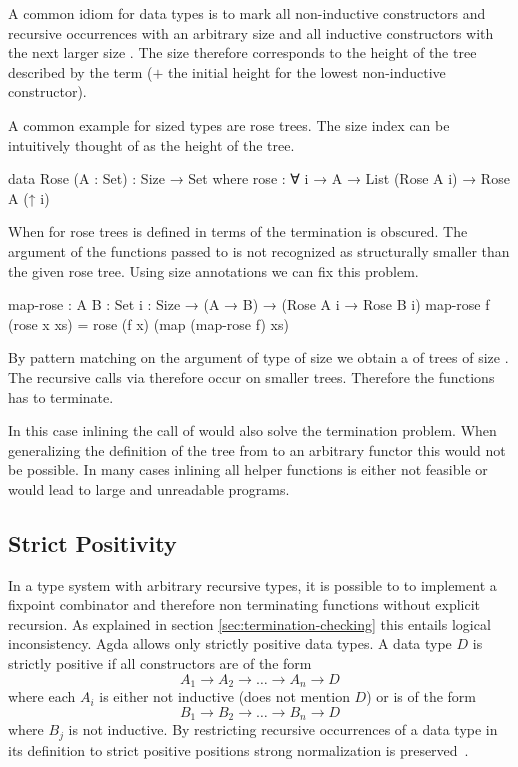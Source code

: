 A common idiom for data types is to mark all non-inductive constructors and
recursive occurrences with an arbitrary size  and all inductive
constructors with the next larger size
\AgdaSpace{}.
The size therefore corresponds to the height of the tree described by the term
($+$ the initial height for the lowest non-inductive constructor).

A common example for sized types are rose trees.
The size index can be intuitively thought of as the height of the tree.

\begin{code}
data Rose (A : Set) : Size → Set where
  rose : ∀ {i} → A → List (Rose A i) → Rose A (↑ i)
\end{code}
When  for rose trees is defined in terms of
 the termination is obscured.
The argument of the functions passed to  is not recognized as
structurally smaller than the given rose tree.
Using size annotations we can fix this problem.

\begin{code}
map-rose : {A B : Set} {i : Size} → (A → B) → (Rose A i → Rose B i)
map-rose f (rose x xs) = rose (f x) (map (map-rose f) xs)
\end{code}
By pattern matching on the argument of type
\AgdaSpace{} of size
\AgdaSpace{} we obtain a  of
trees of size .
The recursive calls via  therefore occur on smaller trees.
Therefore the functions has to terminate.

In this case inlining the call of  would also solve the
termination problem.
When generalizing the definition of the tree from  to an
arbitrary functor this would not be possible.
In many cases inlining all helper functions is either not feasible or would lead
to large and unreadable programs.


\subsection{Strict Positivity}

In a type system with arbitrary recursive types, it is possible to to implement a
fixpoint combinator and therefore non terminating functions without explicit
recursion.
As explained in section \ref{sec:termination-checking} this entails logical
inconsistency.
Agda allows only strictly positive data types.
A data type $D$ is strictly positive if all constructors are of the form
$$
  A_1 \rightarrow A_2 \rightarrow \dots \rightarrow A_n \rightarrow D
$$
where each $A_i$ is either not inductive (does not mention $D$) or is of the form
$$
B_1 \rightarrow B_2 \rightarrow \dots \rightarrow B_n \rightarrow D
$$
where $B_j$ is not inductive.
By restricting recursive occurrences of a data type in its definition to strict
positive positions strong normalization is
preserved~\cite{Wadler1991RecursiveTF}.


